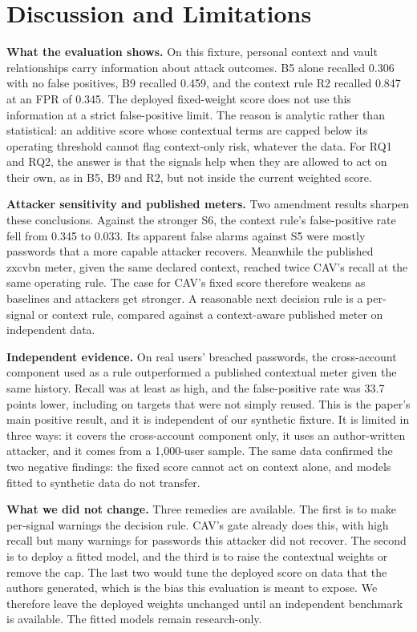 \documentclass[preprint,12pt]{elsarticle}
\begin{document}
\section{Discussion and Limitations}
\textbf{What the evaluation shows.} On this fixture, personal context and vault relationships carry information about attack outcomes. B5 alone recalled 0.306 with no false positives, B9 recalled 0.459, and the context rule R2 recalled 0.847 at an FPR of 0.345. The deployed fixed-weight score does not use this information at a strict false-positive limit. The reason is analytic rather than statistical: an additive score whose contextual terms are capped below its operating threshold cannot flag context-only risk, whatever the data. For RQ1 and RQ2, the answer is that the signals help when they are allowed to act on their own, as in B5, B9 and R2, but not inside the current weighted score.

\textbf{Attacker sensitivity and published meters.} Two amendment results sharpen these conclusions. Against the stronger S6, the context rule's false-positive rate fell from 0.345 to 0.033. Its apparent false alarms against S5 were mostly passwords that a more capable attacker recovers. Meanwhile the published zxcvbn meter, given the same declared context, reached twice CAV's recall at the same operating rule. The case for CAV's fixed score therefore weakens as baselines and attackers get stronger. A reasonable next decision rule is a per-signal or context rule, compared against a context-aware published meter on independent data.

\textbf{Independent evidence.} On real users' breached passwords, the cross-account component used as a rule outperformed a published contextual meter given the same history. Recall was at least as high, and the false-positive rate was 33.7 points lower, including on targets that were not simply reused. This is the paper's main positive result, and it is independent of our synthetic fixture. It is limited in three ways: it covers the cross-account component only, it uses an author-written attacker, and it comes from a 1,000-user sample. The same data confirmed the two negative findings: the fixed score cannot act on context alone, and models fitted to synthetic data do not transfer.

\textbf{What we did not change.} Three remedies are available. The first is to make per-signal warnings the decision rule. CAV's gate already does this, with high recall but many warnings for passwords this attacker did not recover. The second is to deploy a fitted model, and the third is to raise the contextual weights or remove the cap. The last two would tune the deployed score on data that the authors generated, which is the bias this evaluation is meant to expose. We therefore leave the deployed weights unchanged until an independent benchmark is available. The fitted models remain research-only.
\end{document}
